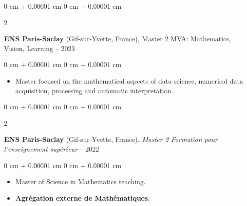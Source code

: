 \documentclass[10pt, letterpaper]{article}
\newenvironment{highlights}{
    \begin{itemize}[
        topsep=0.10 cm,
        parsep=0.10 cm,
        partopsep=0pt,
        itemsep=0pt,
        leftmargin=0 cm + 10pt
    ]
}{
    \end{itemize}
} %
\newenvironment{onecolentry}{
    \begin{adjustwidth}{
        0 cm + 0.00001 cm
    }{
        0 cm + 0.00001 cm
    }
}{
    \end{adjustwidth}
} %
\newenvironment{twocolentry}[2][]{
    \onecolentry
    \def\secondColumn{#2}
    \setcolumnwidth{\fill, 4.5 cm}
    \begin{paracol}{2}
}{
    \switchcolumn \raggedleft \secondColumn
    \end{paracol}
    \endonecolentry
} %
\begin{document}
        \vspace{0.2 cm}

        \begin{twocolentry}{
            2022 – 2023
        }
            \textbf{ENS Paris-Saclay} (Gif-sur-Yvette, France), Master 2 MVA: Mathematics, Vision, Learning\end{twocolentry}
        \vspace{0.10 cm}
        \begin{onecolentry}
            \begin{highlights}
                \item Master focused on the mathematical aspects of data science, numerical data acquisition, processing and  automatic interpretation.
            \end{highlights}
        \end{onecolentry}

        \vspace{0.2 cm}

        \begin{twocolentry}{
            2021 – 2022
        }
            \textbf{ENS Paris-Saclay} (Gif-sur-Yvette, France), \textit{Master 2 Formation pour l’enseignement supérieur}\end{twocolentry}
        \vspace{0.1 cm}
        \begin{onecolentry}
            \begin{highlights}
                \item Master of Science in Mathematics teaching. 
                \item \textbf{Agrégation externe de Mathématiques}.
            \end{highlights}
        \end{onecolentry}

        \vspace{0.2 cm}
\end{document}
